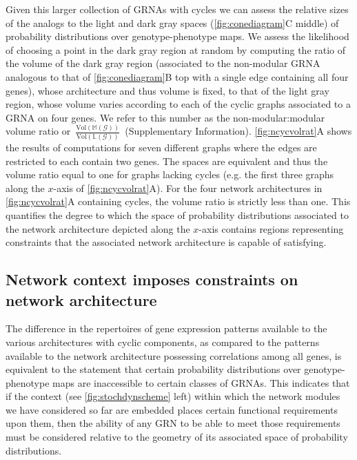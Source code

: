 Given this larger collection of GRNAs with cycles we can assess the relative sizes of the analogs to the light and dark gray spaces (\ref{fig:conediagram}C middle) of probability distributions over genotype-phenotype maps. We assess the likelihood of choosing a point in the dark gray region at random by computing the ratio of the volume of the dark gray region (associated to the non-modular GRNA analogous to that of \ref{fig:conediagram}B top with a single edge containing all four genes), whose architecture and thus volume is fixed, to that of the light gray region, whose volume varies according to each of the cyclic graphs associated to a GRNA on four genes. We refer to this number as the non-modular:modular volume ratio or~$\frac{\text{Vol}(\mathbb{M}(\mathcal{G}))}{\text{Vol}(\mathbb{L}(\mathcal{G}))}$~(Supplementary Information). \ref{fig:ncycvolrat}A shows the results of computations for seven different graphs where the edges are restricted to each contain two genes. The spaces are equivalent and thus the volume ratio equal to one for graphs lacking cycles (e.g. the first three graphs along the $x$-axis of \ref{fig:ncycvolrat}A). For the four network architectures in \ref{fig:ncycvolrat}A containing cycles, the volume ratio is strictly less than one. This quantifies the degree to which the space of probability distributions associated to the network architecture depicted along the $x$-axis contains regions representing constraints that the associated network architecture is capable of satisfying.

\subsection{Network context imposes constraints on network architecture}

The difference in the repertoires of gene expression patterns available to the various architectures with cyclic components, as compared to the patterns available to the network architecture possessing correlations among all genes, is equivalent to the statement that certain probability distributions over genotype-phenotype maps are inaccessible to certain classes of GRNAs. This indicates that if the context (see \ref{fig:stochdynscheme} left) within which the network modules we have considered so far are embedded places certain functional requirements upon them, then the ability of any GRN to be able to meet those requirements must be considered relative to the geometry of its associated space of probability distributions.

